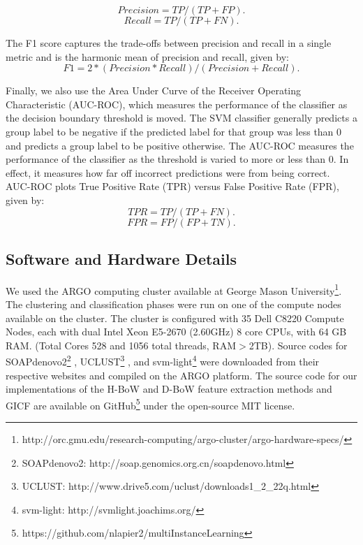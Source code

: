 \begin{equation}
Precision = TP / (TP + FP). \label{eqn:prec}
\end{equation}
\begin{equation}
Recall = TP / (TP +FN). \label{eqn:roc}
\end{equation}

The F1 score captures the trade-offs between precision and recall in a
single metric and is the harmonic mean of precision and recall, given by:
\begin{equation}
F1 = 2 * (Precision * Recall)/ (Precision + Recall). \label{eqn:f1}
\end{equation}

Finally, we also use the Area Under Curve of the Receiver Operating Characteristic (AUC-ROC), which measures the performance of the classifier as the decision boundary threshold is moved. The SVM classifier generally predicts a group label to be negative if the predicted label for that group was less than 0 and predicts a group label to be positive otherwise. The AUC-ROC measures the performance of the classifier as the threshold is varied to more or less than 0. In effect, it measures how far off incorrect predictions were from being correct. AUC-ROC plots True Positive Rate (TPR) versus False Positive Rate (FPR), given by:
\begin{equation}
TPR  = TP / (TP + FN). \label{eqn:roc}
\end{equation}
\begin{equation}
FPR = FP / (FP + TN). \label{eqn:prec}
\end{equation}

\subsection{Software and Hardware Details}
We used the ARGO computing cluster available at George Mason University\footnote{http://orc.gmu.edu/research-computing/argo-cluster/argo-hardware-specs/}. The clustering and classification phases were run on one of the compute nodes available on the cluster. The cluster is configured with 35 Dell C8220 Compute Nodes, each with dual Intel Xeon E5-2670 (2.60GHz) 8 core CPUs, with 64 GB RAM. (Total Cores 528 and 1056 total threads, RAM$>$2TB). Source codes for 
SOAPdenovo2\footnote{SOAPdenovo2: http://soap.genomics.org.cn/soapdenovo.html} \cite{luo12}, UCLUST\footnote{UCLUST: http://www.drive5.com/uclust/downloads1\_{}2\_{}22q.html}    \cite{Edgar10}, and svm-light\footnote{svm-light: http://svmlight.joachims.org/} \cite{joachims08}
were downloaded from their respective websites and compiled on the ARGO platform. The source code for our implementations of the H-BoW and D-BoW feature extraction methods and GICF are available on GitHub\footnote{https://github.com/nlapier2/multiInstanceLearning}
under the open-source MIT license.
